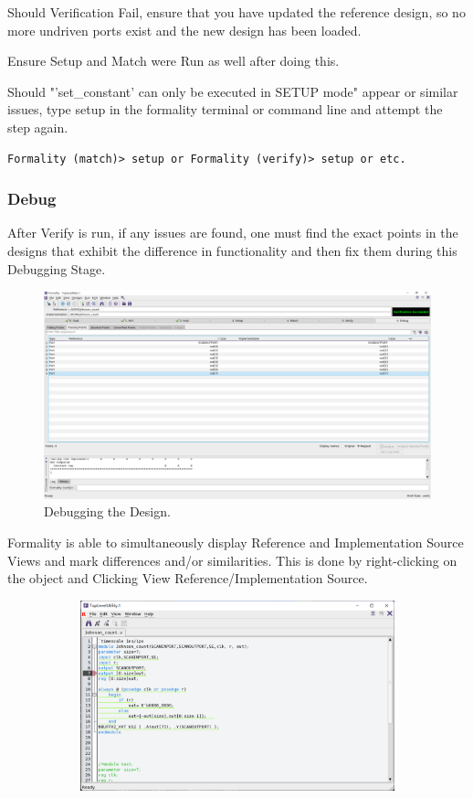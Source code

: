 \documentclass[a4paper,12pt,twoside]{article}
\begin{document}
Should Verification Fail, ensure that you have updated the reference design, so no more undriven ports exist and the new design has been loaded.

Ensure Setup and Match were Run as well after doing this.

Should "'set\_constant' can only be executed in SETUP mode" appear or similar issues, type setup in the formality terminal or command line and attempt the step again.
\begin{verbatim}
Formality (match)> setup or Formality (verify)> setup or etc.
\end{verbatim}
\subsubsection{Debug}\label{SDebug}
After Verify is run, if any issues are found, one must find the exact points in the designs that exhibit the difference in functionality and then fix them during this Debugging Stage.
\begin{figure}[H]
    \centering
    \includegraphics[width=\textwidth]{images/53.png}
    \caption{Debugging the Design.}
\end{figure}
Formality is able to simultaneously display Reference and Implementation Source Views and mark differences and/or similarities. This is done by right-clicking on the object and Clicking View Reference/Implementation Source.
\begin{figure}[H]
    \centering
    \begin{subfigure}{\textwidth}
        \includegraphics[width=\textwidth]{images/54.png}
    \end{subfigure}
\end{figure}
\end{document}

